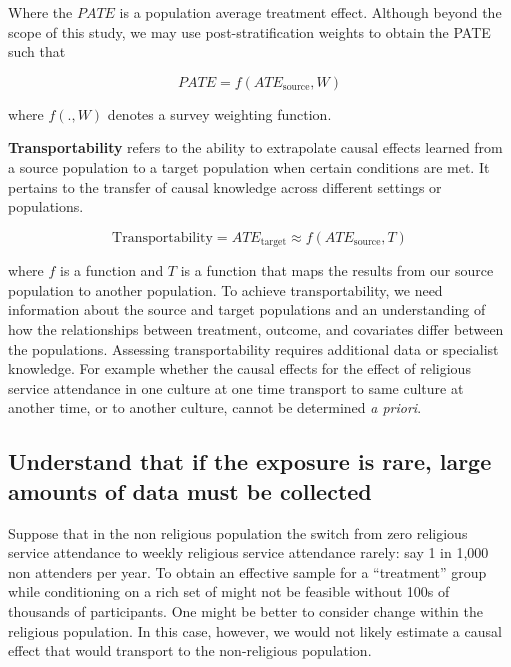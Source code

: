 \documentclass[
  singlecolumn]{report}
\begin{document}
Where the \(PATE\) is a population average treatment effect. Although
beyond the scope of this study, we may use post-stratification weights
to obtain the PATE such that

\[PATE =  f(ATE_{\text{source}}, W)\]

where \(f(.,W)\) denotes a survey weighting function.

\textbf{Transportability} refers to the ability to extrapolate causal
effects learned from a source population to a target population when
certain conditions are met. It pertains to the transfer of causal
knowledge across different settings or populations.

\[\text{Transportability} = ATE_{\text{target}} \approx f(ATE_{\text{source}}, T)\]

where \(f\) is a function and \(T\) is a function that maps the results
from our source population to another population. To achieve
transportability, we need information about the source and target
populations and an understanding of how the relationships between
treatment, outcome, and covariates differ between the populations.
Assessing transportability requires additional data or specialist
knowledge. For example whether the causal effects for the effect of
religious service attendance in one culture at one time transport to
same culture at another time, or to another culture, cannot be
determined \emph{a priori}.

\hypertarget{understand-that-if-the-exposure-is-rare-large-amounts-of-data-must-be-collected}{%
\subsection{\texorpdfstring{\textbf{Understand that if the exposure is
rare, large amounts of data must be
collected}}{Understand that if the exposure is rare, large amounts of data must be collected}}\label{understand-that-if-the-exposure-is-rare-large-amounts-of-data-must-be-collected}}

Suppose that in the non religious population the switch from zero
religious service attendance to weekly religious service attendance
rarely: say 1 in 1,000 non attenders per year. To obtain an effective
sample for a ``treatment'' group while conditioning on a rich set of
might not be feasible without 100s of thousands of participants. One
might be better to consider change within the religious population. In
this case, however, we would not likely estimate a causal effect that
would transport to the non-religious population.
\end{document}
